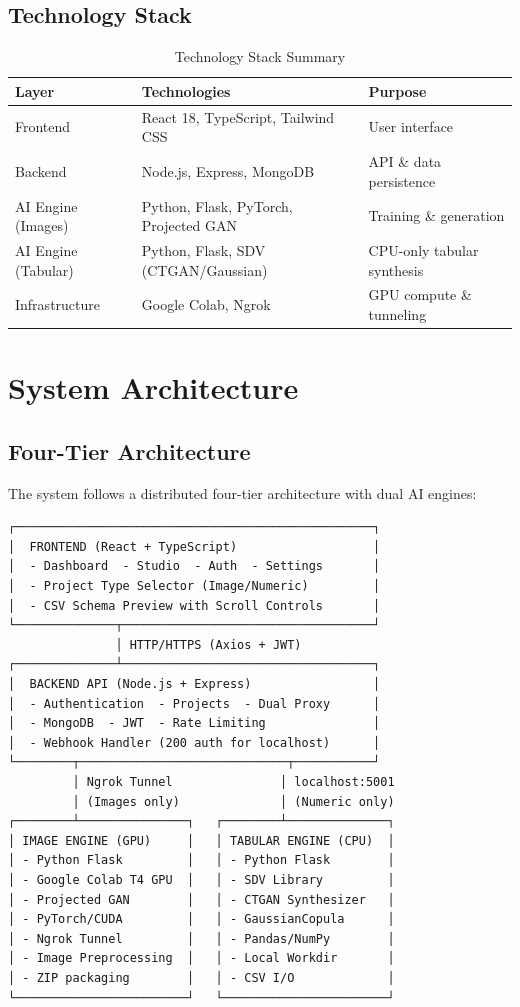 \documentclass[11pt,a4paper]{article}
\begin{document}
\subsection{Technology Stack}
\begin{table}[H]
\centering
\small
\begin{tabular}{lll}
\toprule
\textbf{Layer} & \textbf{Technologies} & \textbf{Purpose} \\
\midrule
Frontend & React 18, TypeScript, Tailwind CSS & User interface \\
Backend & Node.js, Express, MongoDB & API \& data persistence \\
AI Engine (Images) & Python, Flask, PyTorch, Projected GAN & Training \& generation \\
AI Engine (Tabular) & Python, Flask, SDV (CTGAN/Gaussian) & CPU-only tabular synthesis \\
Infrastructure & Google Colab, Ngrok & GPU compute \& tunneling \\
\bottomrule
\end{tabular}
\caption{Technology Stack Summary}
\end{table}

\section{System Architecture}

\subsection{Four-Tier Architecture}

The system follows a distributed four-tier architecture with dual AI engines:

\begin{verbatim}
┌──────────────────────────────────────────────────┐
│  FRONTEND (React + TypeScript)                   │
│  - Dashboard  - Studio  - Auth  - Settings       │
│  - Project Type Selector (Image/Numeric)         │
│  - CSV Schema Preview with Scroll Controls       │
└──────────────┬───────────────────────────────────┘
               │ HTTP/HTTPS (Axios + JWT)
┌──────────────┴───────────────────────────────────┐
│  BACKEND API (Node.js + Express)                 │
│  - Authentication  - Projects  - Dual Proxy      │
│  - MongoDB  - JWT  - Rate Limiting               │
│  - Webhook Handler (200 auth for localhost)      │
└────────┬─────────────────────────────┬───────────┘
         │ Ngrok Tunnel               │ localhost:5001
         │ (Images only)              │ (Numeric only)
┌────────┴───────────────┐   ┌────────┴──────────────┐
│ IMAGE ENGINE (GPU)     │   │ TABULAR ENGINE (CPU)  │
│ - Python Flask         │   │ - Python Flask        │
│ - Google Colab T4 GPU  │   │ - SDV Library         │
│ - Projected GAN        │   │ - CTGAN Synthesizer   │
│ - PyTorch/CUDA         │   │ - GaussianCopula      │
│ - Ngrok Tunnel         │   │ - Pandas/NumPy        │
│ - Image Preprocessing  │   │ - Local Workdir       │
│ - ZIP packaging        │   │ - CSV I/O             │
└────────────────────────┘   └───────────────────────┘
\end{verbatim}
\end{document}
